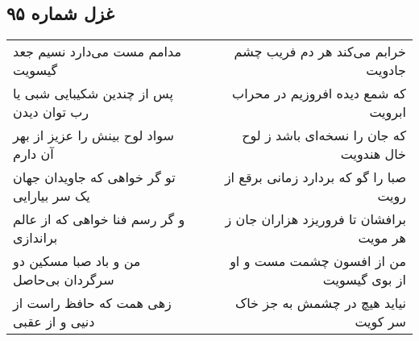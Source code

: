\begin{center}
\section*{غزل شماره ۹۵}
\label{sec:sh095}
\begin{longtable}{l p{0.5cm} r}
مدامم مست می‌دارد نسیم جعد گیسویت
&&
خرابم می‌کند هر دم فریب چشم جادویت
\\
پس از چندین شکیبایی شبی یا رب توان دیدن
&&
که شمع دیده افروزیم در محراب ابرویت
\\
سواد لوح بینش را عزیز از بهر آن دارم
&&
که جان را نسخه‌ای باشد ز لوح خال هندویت
\\
تو گر خواهی که جاویدان جهان یک سر بیارایی
&&
صبا را گو که بردارد زمانی برقع از رویت
\\
و گر رسم فنا خواهی که از عالم براندازی
&&
برافشان تا فروریزد هزاران جان ز هر مویت
\\
من و باد صبا مسکین دو سرگردان بی‌حاصل
&&
من از افسون چشمت مست و او از بوی گیسویت
\\
زهی همت که حافظ راست از دنیی و از عقبی
&&
نیاید هیچ در چشمش به جز خاک سر کویت
\\
\end{longtable}
\end{center}
